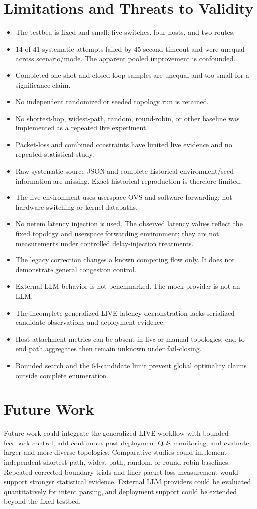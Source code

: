 \documentclass[conference]{IEEEtran}
\begin{document}
\section{Limitations and Threats to Validity}
\begin{itemize}
\item The testbed is fixed and small: five switches, four hosts, and two
routes.
\item 14 of 41 systematic attempts failed by 45-second timeout and were
unequal across scenario/mode. The apparent pooled improvement is confounded.
\item Completed one-shot and closed-loop samples are unequal and too small for
a significance claim.
\item No independent randomized or seeded topology run is retained.
\item No shortest-hop, widest-path, random, round-robin, or other baseline
was implemented as a repeated live experiment.
\item Packet-loss and combined constraints have limited live evidence and no
repeated statistical study.
\item Raw systematic source JSON and complete historical environment/seed
information are missing. Exact historical reproduction is therefore limited.
\item The live environment uses userspace OVS and software forwarding, not
hardware switching or kernel datapaths.
\item No netem latency injection is used. The observed latency values reflect
the fixed topology and userspace forwarding environment; they are not
measurements under controlled delay-injection treatments.
\item The legacy correction changes a known competing flow only. It does not
demonstrate general congestion control.
\item External LLM behavior is not benchmarked. The mock provider is not an
LLM.
\item The incomplete generalized LIVE latency demonstration lacks serialized
candidate observations and deployment evidence.
\item Host attachment metrics can be absent in live or manual topologies;
end-to-end path aggregates then remain unknown under fail-closing.
\item Bounded search and the 64-candidate limit prevent global optimality
claims outside complete enumeration.
\end{itemize}

\section{Future Work}
Future work could integrate the generalized LIVE workflow with bounded
feedback control, add continuous post-deployment QoS monitoring, and evaluate
larger and more diverse topologies. Comparative studies could implement
independent shortest-path, widest-path, random, or round-robin baselines.
Repeated corrected-boundary trials and finer packet-loss measurement would
support stronger statistical evidence. External LLM providers could be
evaluated quantitatively for intent parsing, and deployment support could be
extended beyond the fixed testbed.
\end{document}
